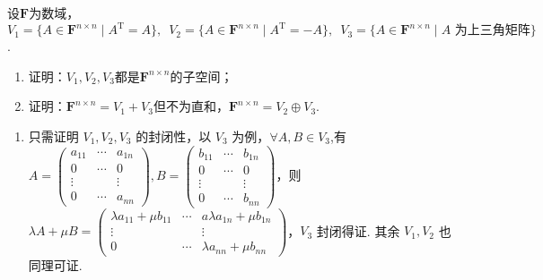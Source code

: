 \begin{exercise}
\begin{exgroup}
        \item 设$\mathbf{F}$为数域，$V_1=\{A\in\mathbf{F}^{n\times n} \mid A^\mathrm{T}=A\},\enspace
            V_2=\{A\in\mathbf{F}^{n\times n} \mid A^\mathrm{T}=-A\},\enspace V_3=\{A\in\mathbf{F}^{n\times n} \mid A\text{~为上三角矩阵}\}$.
        \begin{enumerate}
            \item 证明：$V_1,V_2,V_3$都是$\mathbf{F}^{n\times n}$的子空间；

            \item 证明：$\mathbf{F}^{n\times n}=V_1+V_3$但不为直和，$\mathbf{F}^{n\times n}=V_2\oplus V_3$.
        \end{enumerate}

       \begin{answer}
        \begin{enumerate}
            \item 只需证明 $V_1,V_2,V_3$ 的封闭性，以 $V_3$ 为例，$\forall A,B\in V_3$,有 $A=\begin{pmatrix}
                          a_{11} & \cdots & a_{1n} \\
                          0      & \cdots & 0      \\
                          \vdots &        & \vdots \\
                          0      & \cdots & a_{nn}
                      \end{pmatrix},B=\begin{pmatrix}
                          b_{11} & \cdots & b_{1n} \\
                          0      & \cdots & 0      \\
                          \vdots &        & \vdots \\
                          0      & \cdots & b_{nn}
                      \end{pmatrix}$，则 $\lambda A+\mu B=\begin{pmatrix}
                          \lambda a_{11}+\mu b_{11} & \cdots & a\lambda a_{1n}+\mu b_{1n} \\
                          \vdots                    &        & \vdots                     \\
                          0                         & \cdots & \lambda a_{nn}+\mu b_{nn}
                      \end{pmatrix}$，$V_3$ 封闭得证. 其余 $V_1,V_2$ 也同理可证.


\end{enumerate}
\end{answer}
\end{exgroup}
\end{exercise}
